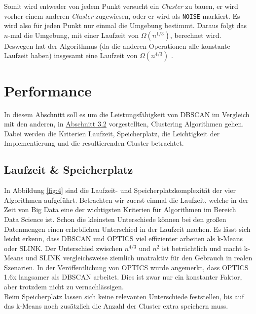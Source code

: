 \documentclass{lni}
\begin{document}

Somit wird entweder von jedem Punkt versucht ein \textit{Cluster} zu bauen, er wird vorher einem anderen \textit{Cluster} zugewiesen, oder er wird als \lstinline{NOISE} markiert. Es wird also für jeden Punkt nur einmal die Umgebung bestimmt. Daraus folgt das $n$-mal die Umgebung, mit einer Laufzeit von $\Omega(n^{1/3})$, berechnet wird. Deswegen hat der Algorithmus (da die anderen Operationen alle konstante Laufzeit haben) insgesamt eine Laufzeit von $\Omega(n^{4/3})$ \cite{REV}. 

%
%

\newpage

\section{Performance}
\label{sec:perf}
In diesem Abschnitt soll es um die Leistungsfähigkeit von DBSCAN im Vergleich mit den anderen, in \hyperref[sec:abstand]{Abschnitt 3.2} vorgestellten, Clustering Algorithmen gehen. Dabei werden die Kriterien Laufzeit, Speicherplatz, die Leichtigkeit der Implementierung und die resultierenden Cluster betrachtet.


\subsection{Laufzeit \& Speicherplatz}

In Abbildung \ref{fig:4} sind die Laufzeit- und Speicherplatzkomplexität der vier Algorithmen aufgeführt. Betrachten wir zuerst einmal die Laufzeit, welche in der Zeit von Big Data eine der wichtigsten Kriterien für Algorithmen im Bereich Data Science ist. Schon die kleinsten Unterschiede können bei den großen Datenmengen einen erheblichen Unterschied in der Laufzeit machen.
Es lässt sich leicht erkenn, dass DBSCAN und OPTICS viel effizienter arbeiten als k-Means oder SLINK. Der Unterschied zwischen $n^{4/3}$ \cite{REV} \cite{REVREV} und $n^2$ ist beträchtlich und macht k-Means und SLINK vergleichsweise ziemlich unatraktiv für den Gebrauch in realen Szenarien. In der Veröffentlichung von OPTICS \cite{OPTICS} wurde angemerkt, dass OPTICS 1.6x langsamer als DBSCAN arbeitet. Dies ist zwar nur ein konstanter Faktor, aber trotzdem nicht zu vernachlässigen.\\
Beim Speicherplatz lassen sich keine relevanten Unterschiede feststellen, bis auf das k-Means noch zusätzlich die Anzahl der Cluster extra speichern muss.\\
\end{document}
